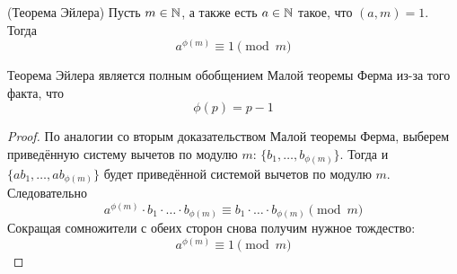 \begin{theorem} (Теорема Эйлера)
	Пусть $m \in \mathbb{N}$, а также есть $a \in \mathbb{N}$ такое, что $(a, m) = 1$. Тогда
	\[
		a^{\phi(m)} \equiv 1 \pmod m
	\]
\end{theorem}

\begin{note}
	Теорема Эйлера является полным обобщением Малой теоремы Ферма из-за того факта, что
	\[
		\phi(p) = p - 1
	\]
\end{note}

\begin{proof}
	По аналогии со вторым доказательством Малой теоремы Ферма, выберем приведённую систему вычетов по модулю $m$: $\{b_1, \ldots, b_{\phi(m)}\}$. Тогда и $\{ab_1, \ldots, ab_{\phi(m)}\}$ будет приведённой системой вычетов по модулю $m$. Следовательно
	\[
		a^{\phi(m)} \cdot b_1 \cdot \ldots \cdot b_{\phi(m)} \equiv b_1 \cdot \ldots \cdot b_{\phi(m)} \pmod m
	\]
	Сокращая сомножители с обеих сторон снова получим нужное тождество:
	\[
		a^{\phi(m)} \equiv 1 \pmod m
	\]
\end{proof}